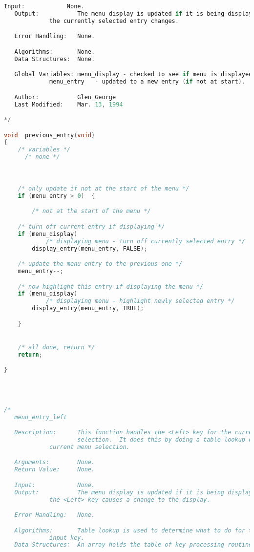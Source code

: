 \begin{lstlisting}[language=C]
   Input:            None.
   Output:           The menu display is updated if it is being displayed and
   		     the currently selected entry changes.

   Error Handling:   None.

   Algorithms:       None.
   Data Structures:  None.

   Global Variables: menu_display - checked to see if menu is displayed.
   		     menu_entry   - updated to a new entry (if not at start).

   Author:           Glen George
   Last Modified:    Mar. 13, 1994

*/

void  previous_entry(void)
{
    /* variables */
      /* none */



    /* only update if not at the start of the menu */
    if (menu_entry > 0)  {

        /* not at the start of the menu */

	/* turn off current entry if displaying */
	if (menu_display)
            /* displaying menu - turn off currently selected entry */
	    display_entry(menu_entry, FALSE);

	/* update the menu entry to the previous one */
	menu_entry--;

	/* now highlight this entry if displaying the menu */
	if (menu_display)
            /* displaying menu - highlight newly selected entry */
	    display_entry(menu_entry, TRUE);

    }


    /* all done, return */
    return;

}




/*
   menu_entry_left

   Description:      This function handles the <Left> key for the current menu
                     selection.  It does this by doing a table lookup on the
		     current menu selection.

   Arguments:        None.
   Return Value:     None.

   Input:            None.
   Output:           The menu display is updated if it is being displayed and
   		     the <Left> key causes a change to the display.

   Error Handling:   None.

   Algorithms:       Table lookup is used to determine what to do for the
   		     input key.
   Data Structures:  An array holds the table of key processing routines.


\end{lstlisting}
